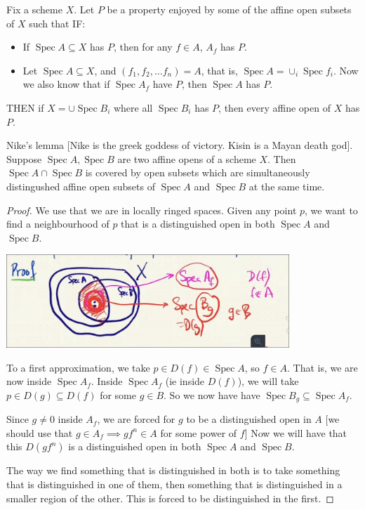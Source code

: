 \documentclass{book}
\newcommand{\Spec}{\operatorname{Spec}}
\newcommand{\spec}{\operatorname{Spec}}
\theoremstyle{definition}
\begin{document}
Fix a scheme $X$. Let $P$ be a property enjoyed by some of the affine
open subsets of $X$ such that IF:

\begin{itemize}
\item If $\spec A \subseteq X$ has $P$, then for any $f \in A$, $A_f$ has
	$P$.
\item Let $\spec A \subseteq X$, and $(f_1, f_2, \dots f_n) = A$, that is,
$\spec A = \cup_i \spec f_i$. Now we also know that if $\spec A_f$ have $P$,
then $\spec A$ has $P$.
\end{itemize}

THEN if $X = \cup \spec B_i$ where all $\spec B_i$ has $P$, then every affine
open of $X$ has $P$.

\begin{lemma}
Nike's lemma [Nike is the greek goddess of victory. Kisin is a Mayan death
god]. Suppose $\spec A, \spec B$ are two affine opens of a scheme $X$.
Then $\spec A \cap \spec B$ is covered by open subsets which are simultaneously
distingushed affine open subsets of $\spec A$ and $\spec B$ at the same time.
\end{lemma}
\begin{proof}
We use that we are in locally ringed spaces. Given any point $p$, we want
to find a neighbourhood of $p$ that is a distinguished open in both $\Spec A$
and $\spec B$.

\includegraphics[width=0.8\textwidth]{nikes-lemma-1.png}

To a first approximation, we take $p \in D(f) \in \spec A$, so $f \in A$. That is,
we are now inside $\spec A_f$. Inside $\spec A_f$ (ie inside $D(f)$),
we will take $p \in D(g) \subseteq D(f)$ for some $g \in B$. So we now have
have $\spec B_g \subseteq \spec A_f$.

Since $g \neq 0$ inside $A_f$, we are forced for $g$ to be a distinguished
open in $A$ [we should use that $g \in A_f \implies g f^n \in A$ for some power of $f$]
Now we will have that this $D(gf^n)$ is a distinguished open in both $\spec A$
and $\spec B$.

The way we find something that is distinguished in both is to take something
that is distinguished in one of them, then something that is distinguished in
a smaller region of the other. This is forced to be distinguished in the first.
\end{proof}
\end{document}
